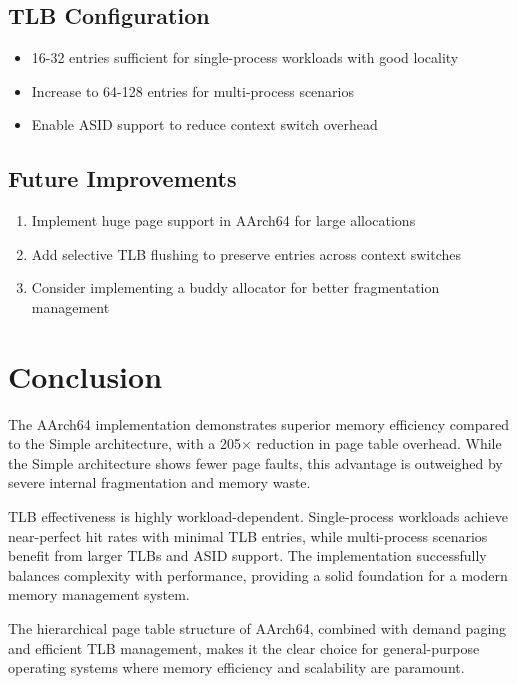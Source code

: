 \documentclass[12pt,a4paper]{article}
\begin{document}
\subsection{TLB Configuration}
\begin{itemize}
    \item 16-32 entries sufficient for single-process workloads with good locality
    \item Increase to 64-128 entries for multi-process scenarios
    \item Enable ASID support to reduce context switch overhead
\end{itemize}

\subsection{Future Improvements}
\begin{enumerate}
    \item Implement huge page support in AArch64 for large allocations
    \item Add selective TLB flushing to preserve entries across context switches
    \item Consider implementing a buddy allocator for better fragmentation management
\end{enumerate}

\section{Conclusion}

The AArch64 implementation demonstrates superior memory efficiency compared to the Simple architecture, with a 205× reduction in page table overhead. While the Simple architecture shows fewer page faults, this advantage is outweighed by severe internal fragmentation and memory waste.

TLB effectiveness is highly workload-dependent. Single-process workloads achieve near-perfect hit rates with minimal TLB entries, while multi-process scenarios benefit from larger TLBs and ASID support. The implementation successfully balances complexity with performance, providing a solid foundation for a modern memory management system.

The hierarchical page table structure of AArch64, combined with demand paging and efficient TLB management, makes it the clear choice for general-purpose operating systems where memory efficiency and scalability are paramount.
\end{document}
